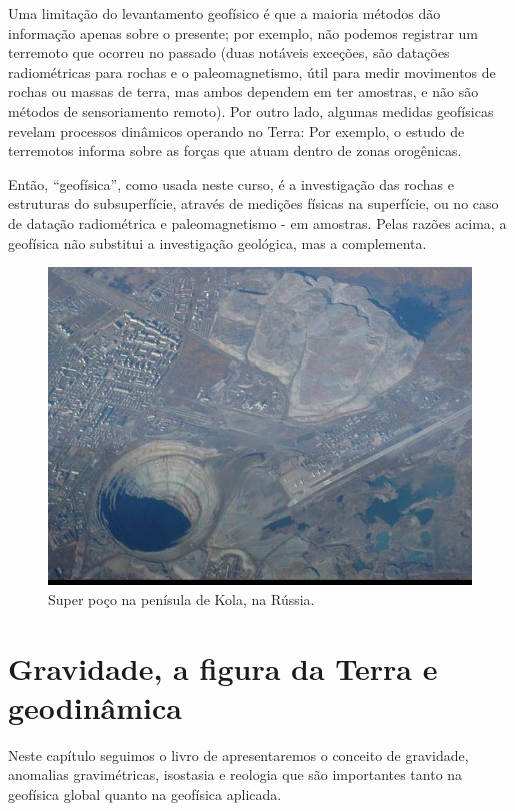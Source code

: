\documentclass[]{book}
\theoremstyle{definition}
\theoremstyle{definition}
\theoremstyle{definition}
\theoremstyle{remark}
\begin{document}
Uma limitação do levantamento geofísico é que a maioria métodos dão informação apenas sobre o presente; por exemplo, não podemos registrar um terremoto que ocorreu no passado (duas notáveis exceções, são datações radiométricas para rochas e o paleomagnetismo, útil para medir movimentos de rochas ou massas de terra, mas ambos dependem em ter amostras, e não são métodos de sensoriamento remoto). Por outro lado, algumas medidas geofísicas revelam processos dinâmicos operando no Terra: Por exemplo, o estudo de terremotos informa sobre as forças que atuam dentro de zonas orogênicas.

Então, ``geofísica'', como usada neste curso, é a investigação das rochas e estruturas do subsuperfície, através de medições físicas na superfície, ou no caso de datação radiométrica e paleomagnetismo - em amostras. Pelas razões acima, a geofísica não substitui a investigação geológica, mas a complementa.

\begin{figure}

{\centering \includegraphics[width=0.7\linewidth]{fig/Fig_01.05} 

}

\caption{Super poço na penísula de Kola, na Rússia.}\label{fig:kola}
\end{figure}

\hypertarget{cap02}{%
\chapter{Gravidade, a figura da Terra e geodinâmica}\label{cap02}}

Neste capítulo seguimos o livro de \citet{lowrie_2007} apresentaremos o conceito de gravidade, anomalias gravimétricas, isostasia e reologia que são importantes tanto na geofísica global quanto na geofísica aplicada.
\end{document}
